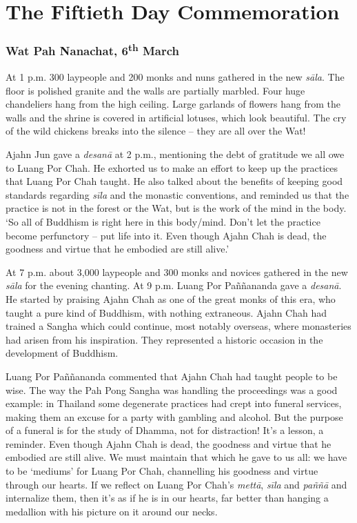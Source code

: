
\chapter{The Fiftieth Day Commemoration}

\subsection*{Wat Pah Nanachat, 6\textsuperscript{th} March}

At 1 p.m. 300 laypeople and 200 monks and nuns gathered in the new
\emph{sāla}. The floor is polished granite and the walls are partially
marbled. Four huge chandeliers hang from the high ceiling. Large
garlands of flowers hang from the walls and the shrine is covered in
artificial lotuses, which look beautiful. The cry of the wild chickens
breaks into the silence -- they are all over the Wat! 

Ajahn Jun gave a \emph{desanā} at 2 p.m., mentioning the debt of gratitude we
all owe to Luang Por Chah. He exhorted us to make an effort to keep up
the practices that Luang Por Chah taught. He also talked about the
benefits of keeping good standards regarding \emph{sīla} and the monastic
conventions, and reminded us that the practice is not in the forest or
the Wat, but is the work of the mind in the body. `So all of Buddhism is
right here in this body/mind. Don't let the practice become perfunctory
-- put life into it. Even though Ajahn Chah is dead, the goodness and
virtue that he embodied are still alive.'

At 7 p.m. about 3,000 laypeople and 300 monks and novices gathered in the
new \emph{sāla} for the evening chanting. At 9 p.m. Luang Por Paññananda gave a
\emph{desanā}. He started by praising Ajahn Chah as one of the great
monks of this era, who taught a pure kind of Buddhism, with nothing
extraneous. Ajahn Chah had trained a Sangha which could continue, most
notably overseas, where monasteries had arisen from his inspiration. 
They represented a historic occasion in the development of Buddhism. 

Luang Por Paññananda commented that Ajahn Chah had taught people to be
wise. The way the Pah Pong Sangha was handling the proceedings was a
good example: in Thailand some degenerate practices had crept into
funeral services, making them an excuse for a party with gambling and
alcohol. But the purpose of a funeral is for the study of Dhamma, not
for distraction! It's a lesson, a reminder. Even though Ajahn Chah is
dead, the goodness and virtue that he embodied are still alive. We must
maintain that which he gave to us all: we have to be `mediums' for Luang
Por Chah, channelling his goodness and virtue through our hearts. If we
reflect on Luang Por Chah's \emph{mettā}, \emph{sīla} and \emph{paññā}
and internalize them, then it's as if he is in our hearts, far better
than hanging a medallion with his picture on it around our necks. 

